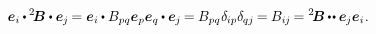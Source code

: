 \nopagebreak\vspace{-0.2em}
\begin{equation}\label{tensorcomponents}
\bm{e}_i
\hspace{-0.1ex} \dotp \hspace{-0.1ex}
\somebivalenttensor
\dotp
\bm{e}_{\hspace{-0.1ex}j} \hspace{-0.2ex}
=
\bm{e}_i
\hspace{-0.1ex} \dotp
\somebivalenttensorcomponents{pq}\bm{e}_p\bm{e}_q
\hspace{-0.1ex} \dotp
\bm{e}_{\hspace{-0.1ex}j} \hspace{-0.2ex}
= \hspace{-0.1ex}
\somebivalenttensorcomponents{pq} \hspace{.1ex}
\delta_{\hspace{-0.1ex}ip}
\delta_{\hspace{-0.1ex}qj} \hspace{-0.2ex}
= \hspace{-0.1ex}
\somebivalenttensorcomponents{i\hspace{-0.1ex}j} \hspace{-0.2ex}
=
\somebivalenttensor
\hspace{-0.1ex} \dotdotp
\bm{e}_{\hspace{-0.1ex}j}
\bm{e}_i
\hspace{.1ex} .
\end{equation}
